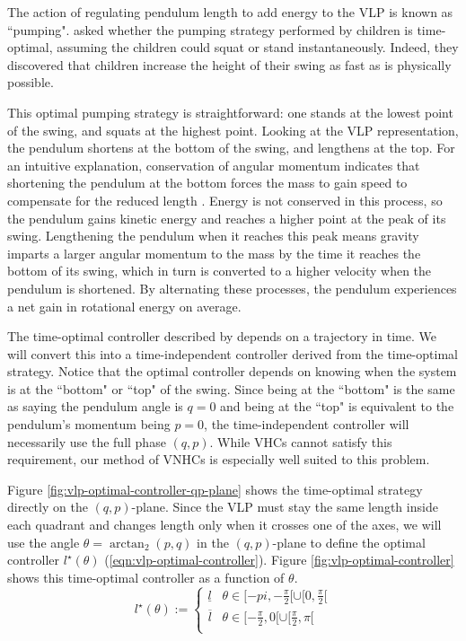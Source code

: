 The action of regulating pendulum length to add energy to the VLP is known as
``pumping". \citet{pumping_swing_standing_squatting} asked whether
the pumping strategy performed by children is time-optimal, assuming the
children could squat or stand instantaneously. 
Indeed, they discovered that children increase the height of their swing as fast
as is physically possible.

This optimal pumping strategy is straightforward:
one stands at the lowest point of the swing, and squats at the highest point.
Looking at the VLP representation, the pendulum shortens at the bottom of the
swing, and lengthens at the top. 
For an intuitive explanation, conservation of angular momentum indicates that
shortening the pendulum at the bottom forces the mass to gain speed to
compensate for the reduced length \cite{how_to_pump_a_swing}.
Energy is not conserved in this process, so the pendulum gains kinetic energy
and reaches a higher point at the peak of its swing.
Lengthening the pendulum when it reaches this peak means gravity
imparts a larger angular momentum to the mass by the time it reaches the bottom
of its swing, which in turn is converted to a higher velocity when the
pendulum is shortened.
By alternating these processes, the pendulum experiences a net gain in
rotational energy on average.

The time-optimal controller described by \cite{pumping_swing_standing_squatting}
depends on a trajectory in time. We will convert this 
into a time-independent controller derived from the time-optimal
strategy. Notice that the optimal controller depends on knowing when the
system is at the ``bottom" or ``top" of the swing. Since being at the ``bottom"
is the same as saying the pendulum angle is \(q = 0\) and being at the ``top" is
equivalent to the pendulum's momentum being \(p = 0\), the time-independent
controller will necessarily use the full phase \((q,p)\). While VHCs cannot
satisfy this requirement, our method of VNHCs is especially well suited to this
problem.

Figure \ref{fig:vlp-optimal-controller-qp-plane} shows the time-optimal strategy directly
on the \((q,p)\)-plane.
Since the VLP must stay the same length inside each quadrant and
changes length only when it crosses one of the axes, we
will use the angle \(\theta = \arctan_2(p,q)\) in the \((q,p)\)-plane to define
the optimal controller \(l^\star(\theta)\) (\ref{eqn:vlp-optimal-controller}).
Figure \ref{fig:vlp-optimal-controller} shows this time-optimal controller as a function of
\(\theta\).
\begin{equation}\label{eqn:vlp-optimal-controller}
   l^\star(\theta):= \begin{cases}
      \underline{l} & \theta \in [-pi, -\frac{\pi}{2}[ \cup [0,\frac{\pi}{2}[ \\
      \overline{l} & \theta \in [-\frac{\pi}{2},0[ \cup [\frac{\pi}{2}, \pi[ \\
   \end{cases}
\end{equation}

